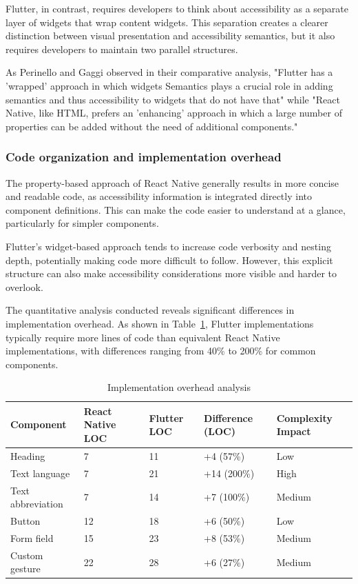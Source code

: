 Flutter, in contrast, requires developers to think about accessibility as a separate layer of widgets that wrap content widgets. This separation creates a clearer distinction between visual presentation and accessibility semantics, but it also requires developers to maintain two parallel structures.

As Perinello and Gaggi \cite{perinello2024accessibility} observed in their comparative analysis, "Flutter has a 'wrapped' approach in which widgets Semantics plays a crucial role in adding semantics and thus accessibility to widgets that do not have that" while "React Native, like HTML, prefers an 'enhancing' approach in which a large number of properties can be added without the need of additional components."

\subsubsection{Code organization and implementation overhead}
The property-based approach of React Native generally results in more concise and readable code, as accessibility information is integrated directly into component definitions. This can make the code easier to understand at a glance, particularly for simpler components.

Flutter's widget-based approach tends to increase code verbosity and nesting depth, potentially making code more difficult to follow. However, this explicit structure can also make accessibility considerations more visible and harder to overlook.

The quantitative analysis conducted reveals significant differences in implementation overhead. As shown in Table~\ref{tab:implementation_overhead_comparison}, Flutter implementations typically require more lines of code than equivalent React Native implementations, with differences ranging from 40\% to 200\% for common components.

\begin{table}[ht]
\caption{Implementation overhead analysis}
\label{tab:implementation_overhead_comparison}
\centering
\begin{tabular}{|p{2.5cm}|p{2.5cm}|p{2.5cm}|p{2.5cm}|p{2.5cm}|}
\hline
\textbf{Component} & \textbf{React Native LOC} & \textbf{Flutter LOC} & \textbf{Difference (LOC)} & \textbf{Complexity Impact} \\
\hline
Heading & 7 & 11 & +4 (57\%) & Low \\
\hline
Text language & 7 & 21 & +14 (200\%) & High \\
\hline
Text abbreviation & 7 & 14 & +7 (100\%) & Medium \\
\hline
Button & 12 & 18 & +6 (50\%) & Low \\
\hline
Form field & 15 & 23 & +8 (53\%) & Medium \\
\hline
Custom gesture & 22 & 28 & +6 (27\%) & Medium \\
\hline
\end{tabular}
\end{table}

